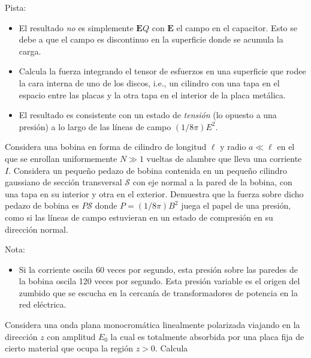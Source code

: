 \documentclass{exam}
\begin{document}
\begin{questions}
  Pista:
  \begin{itemize}
  \item El resultado {\em no} es simplemente $\bm E Q$ con $\bm E$ el
    campo en el capacitor. Esto se debe a que el campo es discontinuo
    en la superficie donde se acumula la carga.
  \item Calcula la fuerza integrando el tensor de esfuerzos en una
    superficie que rodee la cara interna de uno de los discos, i.e.,
    un cilindro con una tapa en el espacio entre las placas y la otra
    tapa en el interior de la placa metálica.
  \item El resultado es consistente con un estado de {\em tensión} (lo
    opuesto a una presión) a lo largo de las líneas de campo
    $(1/8\pi)E^2$.
  \end{itemize}


\question\label{20} Considera una bobina en forma de cilindro de longitud $\ell$
  y radio $a\ll\ell$ en el que se enrollan uniformemente $N\gg1$
  vueltas de alambre que lleva una corriente $I$. Considera un pequeño
  pedazo de bobina contenida en un pequeño cilindro gaussiano de
  sección transversal {$\mathcal S$}
  con eje normal a la pared de la bobina, con una tapa en su interior
  y otra en el exterior. Demuestra que la fuerza sobre dicho pedazo de
  bobina es $P\mathcal S$ donde $P=(1/8\pi)B^2$ juega el papel de una
  presión, como si las líneas de campo estuvieran en un estado de
  compresión en su dirección normal.

  Nota:
  \begin{itemize}
  \item Si la corriente oscila 60 veces por segundo, esta presión
    sobre las paredes de la bobina oscila 120 veces por segundo. Esta
    presión variable es el origen del zumbido que se escucha en la
    cercanía de transformadores de potencia en la red eléctrica.
  \end{itemize}

\question \label{24} Considera una onda plana monocromática
  linealmente polarizada viajando en la dirección $z$ con amplitud
  $E_0$ la cual es totalmente absorbida por una placa fija de cierto material
  que ocupa la región $z>0$. Calcula
\end{questions}
\end{document}
